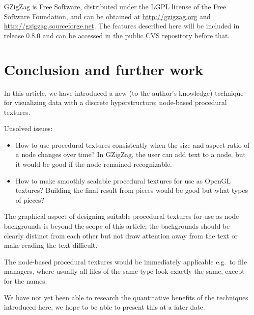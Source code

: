 \documentclass[twocolumn]{IV02}
\def\margincomment#1{
\marginpar{
\vbox{
\scriptsize #1
}
}}
\def\margincomment#1{}
\def\benja#1{\margincomment{benja: #1}}
\begin{document}
GZigZag is Free Software, distributed under the LGPL license of the
Free Software Foundation,
and can be obtained at 
\url{http://gzigzag.org}
and \url{http://gzigzag.sourceforge.net}. 
The features described here will be included in release 0.8.0 and can
be accessed in the public CVS repository before that.


\section{Conclusion and further work}

In this article, we have introduced a new (to the author's 
knowledge) technique for
visualizing data with a discrete hyperstructure: 
node-based procedural textures. 


Unsolved issues:
\begin{itemize}
\item How to use procedural textures consistently when the size and aspect
ratio of a node changes over time? In GZigZag, the user can add text to a node,
but it would be good if the node remained recognizable.
   \benja{
      Use tiles and show more of them as the cell grows. (You should be
      able to compute the different tiles by slightly modifying the
      random number seed when moving one tile to the left/right/top/bottom?)
      This handles aspect ratio changes that grow thecell, too. Changes
      that shrink the cell canbe handled by simply showing less of what's
      already there.
   }
\item How to make smoothly scalable procedural textures for use as OpenGL
textures? Building the final result from pieces would be good but what types
of pieces?
\end{itemize}



The graphical aspect of designing suitable procedural textures for use
as node backgrounds is beyond the scope of this article; the backgrounds
should be clearly distinct from each other but not draw attention
away from the text or make reading the text difficult.

The node-based procedural textures would be immediately applicable
e.g.~to file managers, where usually all files of the same type look
exactly the same, except for the names. 

We have not yet been able to research the quantitative benefits of
the techniques introduced here; we hope to be able to present this
at a later date.

% 

\end{document}
